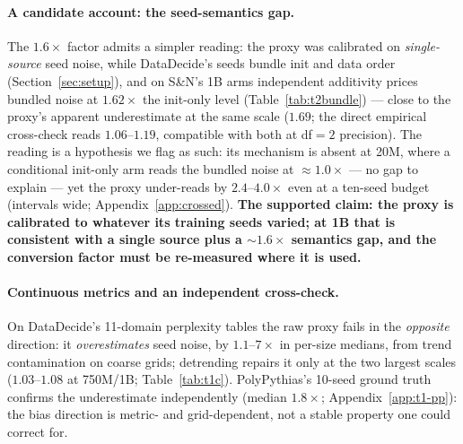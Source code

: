\paragraph{A candidate account: the seed-semantics gap.}
\label{sec:t1-semantics}
The $1.6\times$ factor admits a simpler reading: the proxy was calibrated on
\emph{single-source} seed noise, while DataDecide's seeds bundle init and data order
(Section~\ref{sec:setup}), and on S\&N's 1B arms independent additivity prices bundled noise
at $1.62\times$ the init-only level (Table~\ref{tab:t2bundle}) --- close to the proxy's
apparent underestimate at the same scale ($1.69$; the direct empirical cross-check reads
$1.06$--$1.19$, compatible with both at df$=2$ precision). The reading is a hypothesis we
flag as such: its mechanism is absent at 20M, where a conditional init-only arm reads the
bundled noise at ${\approx}1.0\times$ --- no gap to explain --- yet the proxy under-reads by
$2.4$--$4.0\times$ even at a ten-seed budget (intervals wide; Appendix~\ref{app:crossed}).
\textbf{The supported claim: the proxy is calibrated to whatever its training seeds varied;
at 1B that is consistent with a single source plus a ${\sim}1.6\times$ semantics gap, and
the conversion factor must be re-measured where it is used.}

\paragraph{Continuous metrics and an independent cross-check.}
\label{sec:t1-ppl}
On DataDecide's 11-domain perplexity tables the raw proxy fails in the \emph{opposite}
direction: it \emph{overestimates} seed noise, by $1.1$--$7\times$ in per-size medians, from
trend contamination on coarse grids; detrending repairs it only at the two largest scales
($1.03$--$1.08$ at 750M/1B; Table~\ref{tab:t1c}). PolyPythias's 10-seed ground truth confirms the underestimate independently
(median $1.8\times$; Appendix~\ref{app:t1-pp}): the bias
direction is metric- and grid-dependent, not a stable property one could correct for.

